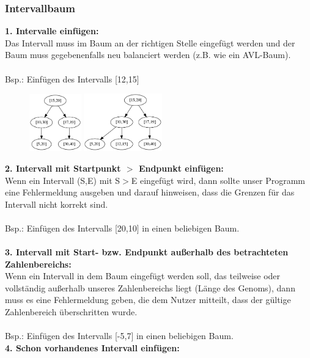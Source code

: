 \subsubsection{Intervallbaum}
\textbf{1. Intervalle einfügen:}\\
Das Intervall muss im Baum an der richtigen Stelle eingefügt werden und der Baum muss gegebenenfalls neu balanciert werden (z.B. wie ein AVL-Baum).\\\\
Bsp.: Einfügen des Intervalls [12,15]
\begin{figure}[H]
 \centering
	\includegraphics[width=0.2\textwidth]{middleware/Testfaelle/1.png}
	\includegraphics[width=0.3\textwidth]{middleware/Testfaelle/2.png}
\end{figure}
\textbf{2. Intervall mit Startpunkt $>$ Endpunkt einfügen:}\\
Wenn ein Intervall (S,E) mit S$>$E eingefügt wird, dann sollte unser Programm eine Fehlermeldung ausgeben und darauf hinweisen, dass die Grenzen für das Intervall nicht korrekt sind.\\\\
Bsp.: Einfügen des Intervalls [20,10] in einen beliebigen Baum.\\\\
\textbf{3. Intervall mit Start- bzw. Endpunkt außerhalb des betrachteten Zahlenbereichs:}\\
Wenn ein Intervall in dem Baum eingefügt werden soll, das teilweise oder vollständig außerhalb unseres Zahlenbereichs liegt (Länge des Genoms), dann muss es eine Fehlermeldung geben, die dem Nutzer mitteilt, dass der gültige Zahlenbereich überschritten wurde.\\\\
Bsp.: Einfügen des Intervalls [-5,7] in einen beliebigen Baum.\newpage\hfill\\
\textbf{4. Schon vorhandenes Intervall einfügen:}\\
